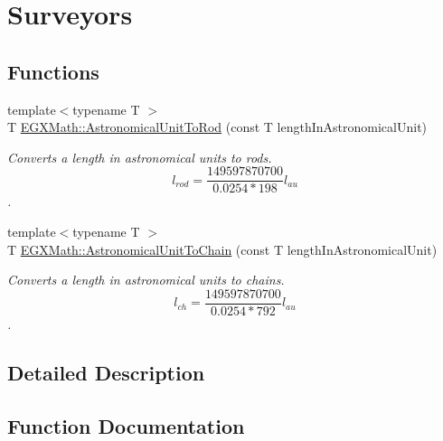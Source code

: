 \hypertarget{group___e_g_x_math-_conversions-_length_conversions-_astronomical-_astronomical_unit-_surveyors}{}\section{Surveyors}
\label{group___e_g_x_math-_conversions-_length_conversions-_astronomical-_astronomical_unit-_surveyors}
\subsection*{Functions}
\begin{DoxyCompactItemize}
\item 
{\footnotesize template$<$typename T $>$ }\\T \mbox{\hyperlink{group___e_g_x_math-_conversions-_length_conversions-_astronomical-_astronomical_unit-_surveyors_gab8120fd6b46c2eb849317bb948254c92}{E\+G\+X\+Math\+::\+Astronomical\+Unit\+To\+Rod}} (const T length\+In\+Astronomical\+Unit)
\begin{DoxyCompactList}\small\item\em Converts a length in astronomical units to rods. \[ l_{rod}= \frac{149597870700}{0.0254 * 198} l_{au} \]. \end{DoxyCompactList}\item 
{\footnotesize template$<$typename T $>$ }\\T \mbox{\hyperlink{group___e_g_x_math-_conversions-_length_conversions-_astronomical-_astronomical_unit-_surveyors_gaaceebc92930ed7feb36522f2dad6dffd}{E\+G\+X\+Math\+::\+Astronomical\+Unit\+To\+Chain}} (const T length\+In\+Astronomical\+Unit)
\begin{DoxyCompactList}\small\item\em Converts a length in astronomical units to chains. \[ l_{ch}= \frac{149597870700}{0.0254 * 792} l_{au} \]. \end{DoxyCompactList}\end{DoxyCompactItemize}


\subsection{Detailed Description}


\subsection{Function Documentation}
\mbox{\label{group___e_g_x_math-_conversions-_length_conversions-_astronomical-_astronomical_unit-_surveyors_gaaceebc92930ed7feb36522f2dad6dffd}} 
